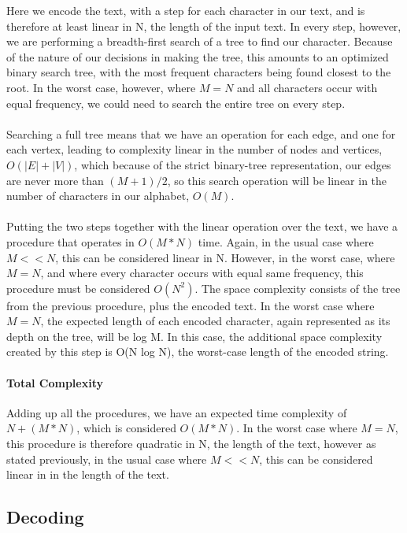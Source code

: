 \documentclass[paper=a4, fontsize=10pt]{article} %
\numberwithin{equation}{section} %
\numberwithin{figure}{section} %
\numberwithin{table}{section} %
\begin{document}
Here we encode the text, with a step for each character in our text, and is therefore at least linear in N, the length of the input text. In every step, however, we are performing a breadth-first search of a tree to find our character. Because of the nature of our decisions in making the tree, this amounts to an optimized binary search tree, with the most frequent characters being found closest to the root. In the worst case, however, where $M = N$ and all characters occur with equal frequency, we could need to search the entire tree on every step.
\\
\\
Searching a full tree means that we have an operation for each edge, and one for each vertex, leading to complexity linear in the number of nodes and vertices, $O(|E| + |V|)$, which because of the strict binary-tree representation, our edges are never more than $(M+1)/2$, so this search operation will be linear in the number of characters in our alphabet, $O(M)$.
\\
\\
Putting the two steps together with the linear operation over the text, we have a procedure that operates in $O(M*N)$ time. Again, in the usual case where $M << N$, this can be considered linear in N. However, in the worst case, where $M = N$, and where every character occurs with equal same frequency, this procedure must be considered $O(N^2)$. The space complexity consists of the tree from the previous procedure, plus the encoded text. In the worst case where $M = N$, the expected length of each encoded character, again represented as its depth on the tree, will be log M. In this case, the additional space complexity created by this step is O(N log N), the worst-case length of the encoded string.

\paragraph{Total Complexity}
Adding up all the procedures, we have an expected time complexity of $N + (M*N)$, which is considered $O(M*N)$. In the worst case where $M = N$, this procedure is therefore quadratic in N, the length of the text, however as stated previously, in the usual case where $M << N$, this can be considered linear in in the length of the text.

\subsection{Decoding}
\end{document}

